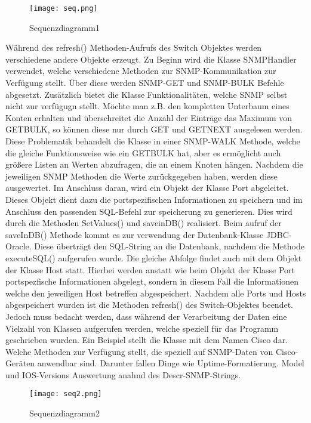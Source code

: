 \begin{figure}[H]
\centering
\texttt{[image: seq.png]}
\caption{Sequenzdiagramm1}
\label{fig:sequecediagram1}
\end{figure}

Während des refresh() Methoden-Aufrufs des Switch Objektes werden verschiedene andere Objekte erzeugt. Zu Beginn wird die Klasse SNMPHandler verwendet, welche verschiedene Methoden zur SNMP-Kommunikation zur Verfügung stellt. Über diese werden SNMP-GET und SNMP-BULK Befehle abgesetzt. Zusätzlich bietet die Klasse Funktionalitäten, welche SNMP selbst nicht zur verfügugn stellt. Möchte man z.B. den kompletten Unterbaum eines Konten erhalten und überschreitet die Anzahl der Einträge das Maximum von GETBULK, so können diese nur durch GET und GETNEXT ausgelesen werden. Diese Problematik behandelt die Klasse in einer SNMP-WALK Methode, welche die gleiche Funktionsweise wie ein GETBULK hat, aber es ermöglicht auch größere Listen an Werten abzufragen, die an einem Knoten hängen. Nachdem die jeweiligen SNMP Methoden die Werte zurückgegeben haben, werden diese ausgewertet. Im Anschluss daran, wird ein Objekt der Klasse Port abgeleitet. Dieses Objekt dient dazu die portspezifischen Informationen zu speichern und im Anschluss den passenden SQL-Befehl zur speicherung zu generieren. Dies wird durch die Methoden SetValues() und saveinDB() realisiert. Beim aufruf der saveInDB() Methode kommt es zur verwendung der Datenbank-Klasse JDBC-Oracle. Diese überträgt den SQL-String an die Datenbank, nachdem die Methode executeSQL() aufgerufen wurde.
Die gleiche Abfolge findet auch mit dem Objekt der Klasse Host statt. Hierbei werden anstatt wie beim Objekt der Klasse Port portspezfische Informationen abgelegt, sondern in diesem Fall die Informationen welche den jeweiligen Host betreffen abgespeichert.
Nachdem alle Ports und Hosts abgespeichert wurden ist die Methoden refresh() des Switch-Objektes beendet.\\
Jedoch muss bedacht werden, dass während der Verarbeitung der Daten eine Vielzahl von Klassen aufgerufen werden, welche speziell für das Programm geschrieben wurden. Ein Beispiel stellt die Klasse mit dem Namen Cisco dar. Welche Methoden zur Verfügung stellt, die speziell auf SNMP-Daten von Cisco-Geräten anwendbar sind. Darunter fallen Dinge wie Uptime-Formatierung. Model und IOS-Versions Auswertung anahnd des Descr-SNMP-Strings.


\begin{figure}[H]
\centering
\texttt{[image: seq2.png]}
\caption{Sequenzdiagramm2}
\label{fig:sequecediagram2}
\end{figure}

